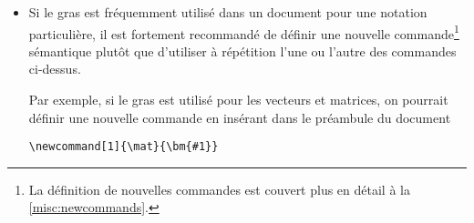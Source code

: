 \begin{itemize}
\begin{lstlisting}
\end{lstlisting}
  pour placer un  mathématique en gras. Le paquetage
  offre différentes combinaisons de lettres latines et grecques
  droites ou italiques en gras selon la valeur de l'option
  ; consulter la section~5 de la %
  . %
  \begin{demo}
    \begin{texample}[0.6\linewidth]
\begin{lstlisting}
% avec l'option bold-style=ISO
\theta \symbf{\theta} +
\Gamma \symbf{\Gamma} \symbf{+}
A \symbf{A}
\end{lstlisting}
      \producing
      $\theta \symbf{\theta} + \Gamma \symbf{\Gamma} \symbf{+}
      A \symbf{A}$
    \end{texample}
  \end{demo}
\item Si le gras est fréquemment utilisé dans un document pour une
  notation particulière, il est fortement recommandé de définir une
  nouvelle commande\footnote{%
    La définition de nouvelles commandes est couvert plus en détail à
    la \autoref{misc:newcommands}.} %
  sémantique plutôt que d'utiliser à répétition l'une ou l'autre des
  commandes ci-dessus.

  Par exemple, si le gras est utilisé pour les vecteurs et matrices,
  on pourrait définir une nouvelle commande \cmdprint{\mat} en
  insérant dans le préambule du document
\begin{lstlisting}
\newcommand[1]{\mat}{\bm{#1}}
\end{lstlisting}
\end{itemize}

